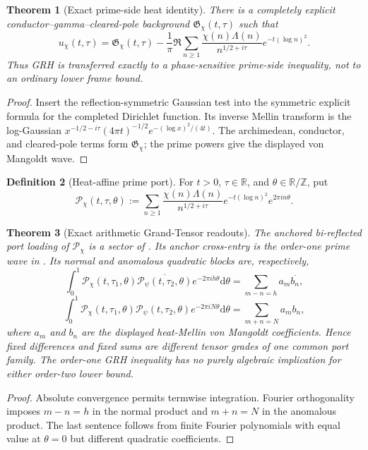 \documentclass[11pt]{article}
\newtheorem{theorem}{Theorem}[section]
\theoremstyle{definition}
\newtheorem{definition}[theorem]{Definition}
\theoremstyle{remark}
\newcommand{\Z}{\mathbb Z}
\newcommand{\R}{\mathbb R}
\newcommand{\dd}{\mathrm d}
\begin{document}
\begin{theorem}[Exact prime-side heat identity]
\label{thm:prime-side-heat-master}
There is a completely explicit conductor--gamma--cleared-pole background
$\mathfrak G_\chi(t,\tau)$ such that
\[
 \boxed{
 u_\chi(t,\tau)
 =\mathfrak G_\chi(t,\tau)
 -\frac1\pi\Re\sum_{n\ge1}
 \frac{\chi(n)\Lambda(n)}{n^{1/2+i\tau}}
 e^{-t(\log n)^2}.}
\]
Thus GRH is transferred exactly to a phase-sensitive prime-side inequality,
not to an ordinary lower frame bound.
\end{theorem}

\begin{proof}
Insert the reflection-symmetric Gaussian test into the symmetric explicit
formula for the completed Dirichlet function.  Its inverse Mellin transform is
the log-Gaussian
$x^{-1/2-i\tau}(4\pi t)^{-1/2}e^{-(\log x)^2/(4t)}$.  The archimedean,
conductor, and cleared-pole terms form $\mathfrak G_\chi$; the prime powers
give the displayed von Mangoldt wave.
\end{proof}

\begin{definition}[Heat-affine prime port]
For $t>0$, $\tau\in\R$, and $\theta\in\R/\Z$, put
\[
 \mathcal P_\chi(t,\tau,\theta)
 :=\sum_{n\ge1}\frac{\chi(n)\Lambda(n)}{n^{1/2+i\tau}}
 e^{-t(\log n)^2}e^{2\pi in\theta}.
\]
\end{definition}

\begin{theorem}[Exact arithmetic Grand-Tensor readouts]
\label{thm:arithmetic-grand-readouts}
The anchored bi-reflected port loading of $\mathcal P_\chi$ is a sector of
.  Its anchor cross-entry is the order-one prime
wave in .  Its normal and anomalous quadratic
blocks are, respectively,
\[
 \boxed{
 \int_0^1\mathcal P_\chi(t,\tau_1,\theta)
 \overline{\mathcal P_\psi(t,\tau_2,\theta)}e^{-2\pi ih\theta}\dd\theta
 =\sum_{m-n=h}a_m\overline{b_n},}
\]
\[
 \boxed{
 \int_0^1\mathcal P_\chi(t,\tau_1,\theta)
 \mathcal P_\psi(t,\tau_2,\theta)e^{-2\pi iN\theta}\dd\theta
 =\sum_{m+n=N}a_mb_n,}
\]
where $a_m$ and $b_n$ are the displayed heat-Mellin von Mangoldt
coefficients.  Hence fixed differences and fixed sums are different tensor
grades of one common port family.  The order-one GRH inequality has no purely
algebraic implication for either order-two lower bound.
\end{theorem}

\begin{proof}
Absolute convergence permits termwise integration.  Fourier orthogonality
imposes $m-n=h$ in the normal product and $m+n=N$ in the anomalous product.
The last sentence follows from finite Fourier polynomials with equal value at
$\theta=0$ but different quadratic coefficients.
\end{proof}
\end{document}
